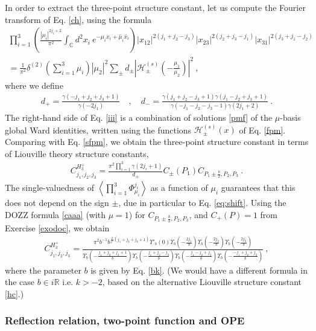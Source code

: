 \documentclass[12pt, a4paper, notitlepage, twoside]{report}
\numberwithin{equation}{section}
\theoremstyle{break}
\begin{document}
In order to extract the three-point structure constant, let us compute the Fourier transform of Eq. \eqref{ch}, using the formula \cite{rt05}
\begin{multline}
 \prod_{i=1}^3\left(\frac{|\mu_i|^{2j_i+2}}{\pi^2}\int_{{\mathbb{C}}}d^2x_i\ e^{-\mu_ix_i+\bar{\mu}_i\bar{x}_i}\right)
|x_{12}|^{2(j_1+j_2-j_3)} |x_{23}|^{2(j_2+j_3-j_1)} |x_{31}|^{2(j_3+j_1-j_2)} 
\\
= \frac{1}{\pi^2}\delta^{(2)}(\textstyle{\sum}_{i=1}^3\mu_i)|\mu_2|^2 \sum_\pm d_\pm \left|\mathcal{H}^{(s)}_\pm(-\tfrac{\mu_1}{\mu_2})\right|^2 \ ,
\label{iii}
\end{multline}
where we define 
\begin{align}
 d_+ = \frac{\gamma(-j_1+j_2+j_3+1)}{\gamma(-2j_1)} \quad , \quad d_- = \frac{\gamma(j_1+j_2-j_3+1)\gamma(j_1-j_2+j_3+1)}{\gamma(-j_1-j_2-j_3-1)\gamma(2j_1+2)}\ .
\end{align}
The right-hand side of Eq. \eqref{iii} is a combination of solutions \eqref{pmf} of the $\mu$-basis global Ward identities, written using the functions $\mathcal{H}^{(s)}_\pm(x)$ of Eq. \eqref{fpm}.
Comparing with Eq. \eqref{sfpm}, we obtain the three-point structure constant in terms of Liouville theory structure constants,
\begin{align}
 C^{H_3^+}_{j_1,j_2,j_3} = \frac{\pi^2\prod_{i=1}^3\gamma(2j_i+1)}{d_\pm}C_{\pm}(P_1)C_{P_1\pm \frac{b}{2},P_2,P_3}\ .
\end{align}
The single-valuedness of $\left\langle \prod_{i=1}^3\Phi^{j_i}_{\mu_i} \right\rangle $ as a function of $\mu_i$ guarantees that this does not depend on the sign $\pm$, due in particular to Eq. \eqref{eq:shift}. 
Using the DOZZ formula \eqref{caaa} (with $\mu=1$) for $C_{P_1\pm \frac{b}{2},P_2,P_3}$, and $C_+(P)=1$ from Exercise \ref{exodoc}, we obtain
\begin{align}
\boxed{C^{H_3^+}_{j_1,j_2,j_3} = \frac{\pi^2b^{-1}b^{\frac{2}{b^2}(j_1+j_2+j_3+1)} \Upsilon'_b(0)\Upsilon_b(-\frac{2j_1}{b})\Upsilon_b(-\frac{2j_2}{b})\Upsilon_b(-\frac{2j_3}{b})}
{\Upsilon_b(-\frac{j_1+j_2+j_3+1}{b})\Upsilon_b(-\frac{j_1+j_2-j_3}{b}) \Upsilon_b(-\frac{j_1-j_2+j_3}{b})\Upsilon_b(-\frac{-j_1+j_2+j_3}{b})}}\ ,
\label{chp}
\end{align}
where the parameter $b$ is given by Eq. \eqref{bk}.
(We would have a different formula in the case $b\in i\mathbb{R}$ i.e. $k>-2$, based on the alternative Liouville structure constant \eqref{hc}.)


\subsubsection{Reflection relation, two-point function and OPE}
\end{document}
